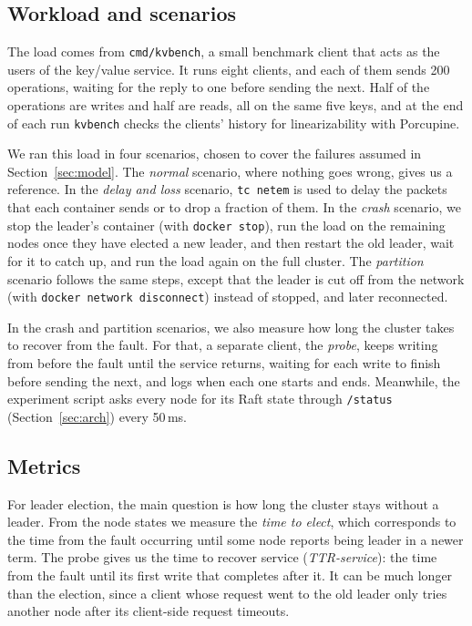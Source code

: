 \documentclass[conference]{IEEEtran}
\begin{document}
\subsection{Workload and scenarios}\label{sec:method-scenarios}
The load comes from \texttt{cmd/kvbench}, a small benchmark client that acts as the users of the key/value service. It runs eight clients, and each of them sends 200 operations,
waiting for the reply to one before sending the next. Half of the operations are writes and half are reads, all on the same five keys,
and at the end of each run \texttt{kvbench} checks the clients' history for linearizability with Porcupine.

We ran this load in four scenarios, chosen to cover the failures assumed in Section~\ref{sec:model}. The \emph{normal} scenario, where nothing goes wrong, gives us a reference.
In the \emph{delay and loss} scenario, \texttt{tc netem} is used to delay the packets that each container sends or to drop a fraction of them. In the \emph{crash} scenario,
we stop the leader's container (with \texttt{docker stop}), run the load on the remaining nodes once they have elected a new leader, and then restart the old leader, wait for it to catch up,
and run the load again on the full cluster. The \emph{partition} scenario follows the same steps, except that the leader is cut off from the network (with \texttt{docker network disconnect})
instead of stopped, and later reconnected.

In the crash and partition scenarios, we also measure how long the cluster takes to recover from the fault. For that, a separate client, the \emph{probe}, keeps writing from before the fault until the service returns, waiting for each write to finish before sending the next, and logs when each one starts and ends. Meanwhile, the experiment script asks every node for its Raft state through \texttt{/status} (Section~\ref{sec:arch}) every 50\,ms.

\subsection{Metrics}\label{sec:method-metrics}
For leader election, the main question is how long the cluster stays without a leader. From the node states we measure the \emph{time to elect},
which corresponds to the time from the fault occurring until some node reports being leader in a newer term. The probe gives us the time to recover service (\emph{TTR-service}):
the time from the fault until its first write that completes after it. It can be much longer than the election,
since a client whose request went to the old leader only tries another node after its client-side request timeouts.
\end{document}
